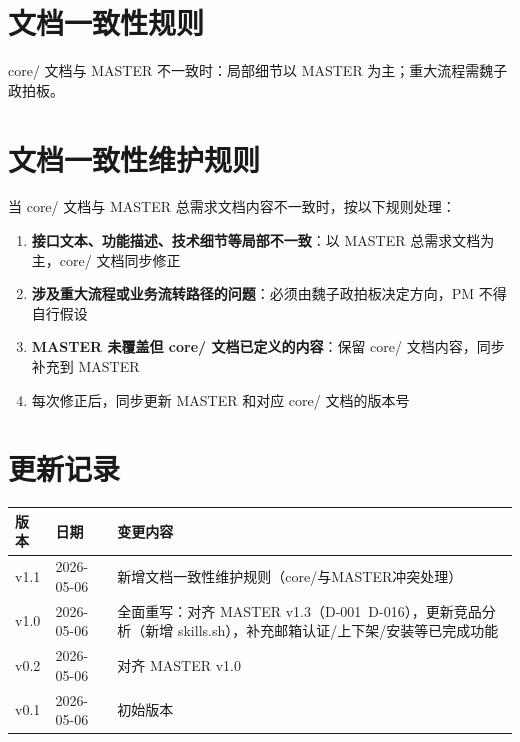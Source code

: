 \documentclass[11pt,a4paper]{article}
\begin{document}
\section{文档一致性规则}

core/ 文档与 MASTER 不一致时：局部细节以 MASTER 为主；重大流程需魏子政拍板。

\section{文档一致性维护规则}

当 core/ 文档与 MASTER 总需求文档内容不一致时，按以下规则处理：
\begin{enumerate}[nosep]
  \item \textbf{接口文本、功能描述、技术细节等局部不一致}：以 MASTER 总需求文档为主，core/ 文档同步修正
  \item \textbf{涉及重大流程或业务流转路径的问题}：必须由魏子政拍板决定方向，PM 不得自行假设
  \item \textbf{MASTER 未覆盖但 core/ 文档已定义的内容}：保留 core/ 文档内容，同步补充到 MASTER
  \item 每次修正后，同步更新 MASTER 和对应 core/ 文档的版本号
\end{enumerate}

\section*{更新记录}

\begin{tabular}{lll}
\toprule
版本 & 日期 & 变更内容 \\
\midrule
v1.1 & 2026-05-06 & 新增文档一致性维护规则（core/与MASTER冲突处理） \\
v1.0 & 2026-05-06 & 全面重写：对齐 MASTER v1.3（D-001~D-016），更新竞品分析（新增 skills.sh），补充邮箱认证/上下架/安装等已完成功能 \\
v0.2 & 2026-05-06 & 对齐 MASTER v1.0 \\
v0.1 & 2026-05-06 & 初始版本 \\
\bottomrule
\end{tabular}
\end{document}
